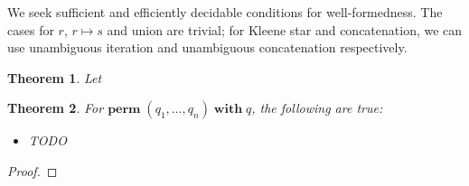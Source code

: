 \documentclass[a4paper,11pt] {article}
\theoremstyle{plain}
\newtheorem*{theorem*}{Theorem}
\newcommand{\perm}{ \textbf{perm}\; }
\newcommand{\with}{ \;\textbf{with}\; }
\begin{document}
We seek sufficient and efficiently decidable conditions for
well-formedness. The cases for $r$, $r \mapsto s$ and union are trivial;
for Kleene star and concatenation, we can use unambiguous iteration
and unambiguous concatenation respectively. 

\begin{theorem*}
Let 
\end{theorem*}


\begin{theorem*}
  For $\perm(q_1,\ldots, q_n) \with q$, the following are true:
  \begin{itemize}
  \item TODO
  \end{itemize}
\end{theorem*}
\begin{proof}

  

\end{proof}
\end{document}
